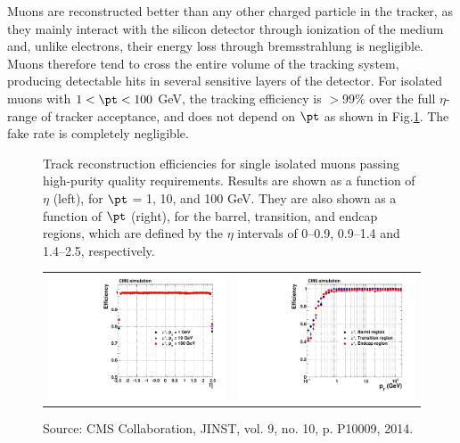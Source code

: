 Muons are reconstructed better than any other charged particle in the tracker, as they mainly
interact with the silicon detector through ionization of the medium and, unlike electrons, their
energy loss through bremsstrahlung is negligible. Muons therefore tend to cross the entire volume
of the tracking system, producing detectable hits in several sensitive layers of the detector.
For isolated muons with $1 < \pt < 100$ GeV, the tracking efficiency is $>$99$\%$ over the full $\eta$-range of tracker acceptance,
and does not depend on $\pt$ as shown in Fig.\ref{fig:trackeff}. The fake rate is completely negligible.

\begin{figure}[!ht]
\caption{
Track reconstruction efficiencies for single isolated muons passing high-purity quality requirements. Results are shown as a function of $\eta$ (left), for $\pt$ = 1, 10, and 100 GeV. They are also shown as a function of $\pt$ (right), for the barrel, transition, and
endcap regions, which are defined by the $\eta$ intervals of 0–0.9, 0.9–1.4 and 1.4–2.5, respectively. 
}
\begin{tabular}{cc}
\includegraphics[width=7cm]{Chapter3_plots/CMS-TRK-11-001_Figure_008-a} &
\includegraphics[width=7cm]{Chapter3_plots/CMS-TRK-11-001_Figure_008-b} \\
\end{tabular}
\caption*{Source: CMS Collaboration, JINST, vol. 9, no. 10, p. P10009, 2014.}
\label{fig:trackeff}
\end{figure}

